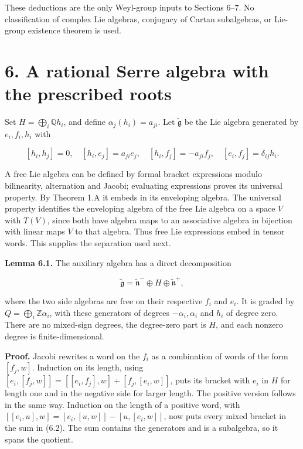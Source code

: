 \documentclass[11pt,a4paper,openany]{report}
\begin{document}
These deductions are the only Weyl-group inputs to Sections 6--7. No classification of complex Lie algebras, conjugacy of Cartan subalgebras, or Lie-group existence theorem is used.

\section{6. A rational Serre algebra with the prescribed roots}\label{AG-RG-S06-a-rational-serre-algebra-with-the-prescribed-roots}

Set \(H=\bigoplus_i\mathbb Q h_i\), and define \(\alpha_j(h_i)=a_{ji}\). Let \(\widetilde{\mathfrak g}\) be the Lie algebra generated by \(e_i,f_i,h_i\) with

\[
[h_i,h_j]=0,\quad [h_i,e_j]=a_{ji}e_j,\quad
[h_i,f_j]=-a_{ji}f_j,\quad [e_i,f_j]=\delta_{ij}h_i.
\tag{6.1}
\]

A free Lie algebra can be defined by formal bracket expressions modulo bilinearity, alternation and Jacobi; evaluating expressions proves its universal property. By Theorem 1.A it embeds in its enveloping algebra. The universal property identifies the enveloping algebra of the free Lie algebra on a space \(V\) with \(T(V)\), since both have algebra maps to an associative algebra in bijection with linear maps \(V\) to that algebra. Thus free Lie expressions embed in tensor words. This supplies the separation used next.

\textbf{Lemma 6.1.} The auxiliary algebra has a direct decomposition

\[
\widetilde{\mathfrak g}=\widetilde{\mathfrak n}^{-}\oplus H
\oplus\widetilde{\mathfrak n}^{+},
\tag{6.2}
\]

where the two side algebras are free on their respective \(f_i\) and \(e_i\). It is graded by \(Q=\bigoplus_i\mathbb Z\alpha_i\), with these generators of degrees \(-\alpha_i,\alpha_i\) and \(h_i\) of degree zero. There are no mixed-sign degrees, the degree-zero part is \(H\), and each nonzero degree is finite-dimensional.

\textbf{Proof.} Jacobi rewrites a word on the \(f_i\) as a combination of words of the form \([f_j,w]\). Induction on its length, using \([e_i,[f_j,w]]=[[e_i,f_j],w]+[f_j,[e_i,w]]\), puts its bracket with \(e_i\) in \(H\) for length one and in the negative side for larger length. The positive version follows in the same way. Induction on the length of a positive word, with \([[e_i,u],w]=[e_i,[u,w]]-[u,[e_i,w]]\), now puts every mixed bracket in the sum in (6.2). The sum contains the generators and is a subalgebra, so it spans the quotient.
\end{document}
